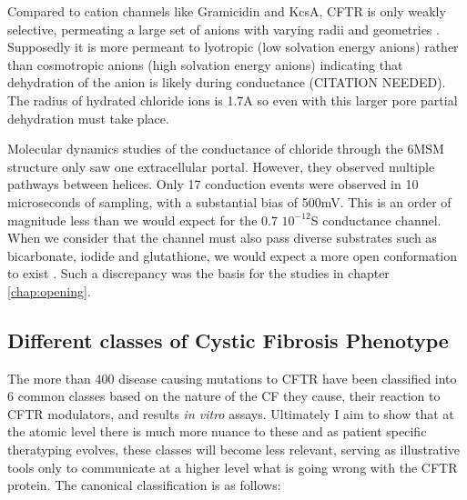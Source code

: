 Compared to cation channels like Gramicidin and KcsA, CFTR is only weakly selective, permeating a large set of anions with varying radii and geometries \cite{}. Supposedly it is more permeant to lyotropic (low solvation energy anions) rather than cosmotropic anions (high solvation energy anions) indicating that dehydration of the anion is likely during conductance (CITATION NEEDED). The radius of hydrated chloride ions is 1.7A \cite{yang2002} so even with this larger pore partial dehydration must take place. 

Molecular dynamics studies of the conductance of chloride through the 6MSM structure only saw one extracellular portal. However, they observed multiple pathways between helices. Only 17 conduction events were observed in 10 microseconds of sampling, with a substantial bias of 500mV. This is an order of magnitude less than we would expect for the 0.7 $10^{-12}$S conductance channel. When we consider that the channel must also pass diverse substrates such as bicarbonate, iodide and glutathione, we would expect a more open conformation to exist \cite{kogan2003,linsdell1998}. Such a discrepancy was the basis for the studies in chapter \ref{chap:opening}.


\subsection{Different classes of Cystic Fibrosis Phenotype}
The more than 400 disease causing mutations to CFTR have been classified into 6 common classes based on the nature of the CF they cause, their reaction to CFTR modulators, and results \textit{in vitro} assays. Ultimately I aim to show that at the atomic level there is much more nuance to these and as patient specific theratyping evolves, these classes will become less relevant, serving as illustrative tools only to communicate at a higher level what is going wrong with the CFTR protein. The canonical classification is as follows:

